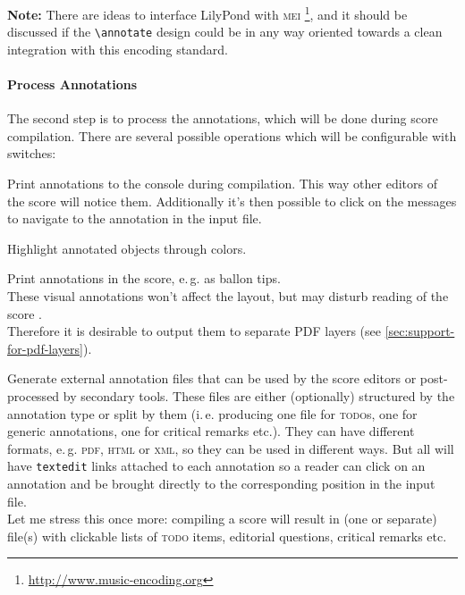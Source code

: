 \documentclass[oneside]{OLLbook}
\begin{document}
\textsf{\textbf{Note:}} There are ideas to interface LilyPond with \textsc{mei}%
\footnote{\url{http://www.music-encoding.org}}, and it should be discussed if the \texttt{\textbackslash annotate} design could be in any way oriented towards a clean integration with this encoding standard.

\paragraph{Process Annotations}
The second step is to process the annotations, which will be done during score compilation.
There are several possible operations which will be configurable with switches:

\begin{itemize*}
\item Print annotations to the console during compilation.
This way other editors of the score will notice them.
Additionally it's then possible to click on the messages to navigate to the annotation in the input file.

\item Highlight annotated objects through colors.

\item Print annotations in the score, e.\,g. as ballon tips.\\
These visual annotations won't affect the layout, but may disturb reading of the score .\\
Therefore it is desirable to output them to separate PDF layers (see \ref{sec:support-for-pdf-layers}).

\item Generate external annotation files that can be used by the score editors or post-processed by secondary tools.
These files are either (optionally) structured by the annotation type or split by them (i.\,e. producing one file for \textsc{todo}s, one for generic annotations, one for critical remarks etc.).
They can have different formats, e.\,g. \textsc{pdf}, \textsc{html} or \textsc{xml}, so they can be used in different ways.
But all will have \texttt{textedit} links attached to each annotation so a reader can click on an annotation and be brought directly to the corresponding position in the input file.\\
Let me stress this once more: compiling a score will result in (one or separate) file(s) with clickable lists of \textsc{todo} items, editorial questions, critical remarks etc.
\end{itemize*}
\end{document}
